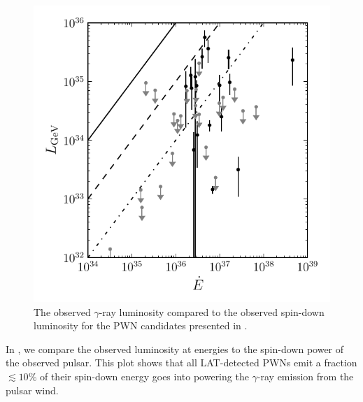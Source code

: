 \begin{figure}[htbp]
  \centering
  \includegraphics{chapters/population_study/figures/pwn_luminosity_vs_edot.pdf}
  \caption{The observed $\gamma$-ray luminosity compared to the
  observed spin-down luminosity for the \ac{PWN} candidates presented
  in .}
\end{figure}

In , we compare the observed luminosity at
\gev energies to the spin-down power of the observed pulsar.  This plot
shows that all \ac{LAT}-detected \acp{PWN} emit a fraction $\lesssim 10\%$
of their spin-down energy goes into powering the $\gamma$-ray emission
from the pulsar wind.

